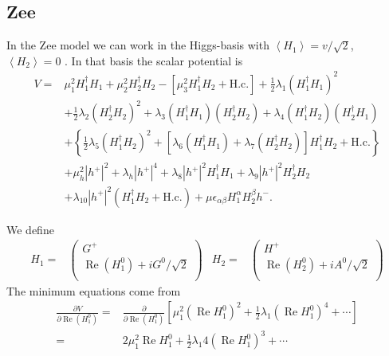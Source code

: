 \subsection{Zee}

In the Zee model we can work in the Higgs-basis with $\left\langle H_1 \right\rangle=v/\sqrt{2}$,  $\left\langle H_2 \right\rangle=0$ \cite{AristizabalSierra:2006ri}. In that basis the scalar potential is
\begin{align}
  \label{eq:scalarpotentialinhiggsbas}
  V  = & \mu^{2}_{1}H_{1}^{\dagger}H_{1}
  + \mu^{2}_{2}H_{2}^{\dagger}H_{2}
  - [\mu^{2}_{3}H_{1}^{\dagger}H_{2} + \mbox{H.c.}]
  + \frac{1}{2}\lambda_{1}(H_{1}^{\dagger}H_{1})^{2}
  \nonumber\\
  & + \frac{1}{2}\lambda_{2}(H_{2}^{\dagger}H_{2})^{2}
  + \lambda_{3}(H_{1}^{\dagger}
  H_{1})(H_{2}^{\dagger}H_{2})
  + \lambda_{4}(H_{1}^{\dagger}
  H_{2})(H_{2}^{\dagger}H_{1})
  \nonumber\\
  & + \left\{
    \frac{1}{2}\lambda_{5}(H_{1}^{\dagger}H_{2})^{2}
    + [\lambda_{6}(H_{1}^{\dagger}H_{1})
    + \lambda_{7}(H_{2}^{\dagger}H_{2})]
    H_{1}^{\dagger}H_{2}
    +\mbox{H.c.}
  \right\}
  \nonumber\\
  & + \mu_{h}^{2}|h^{+}|^{2} + \lambda_{h}|h^{+}|^{4}
  + \lambda_{8}|h^{+}|^{2}H_{1}^{\dagger}H_{1} 
  + \lambda_{9}|h^{+}|^{2}H_{2}^{\dagger}H_{2}
  \nonumber\\
  & + \lambda_{10}|h^{+}|^{2}(H_{1}^\dagger H_{2}
  + \mbox{H.c.})
  + \mu\epsilon_{\alpha\beta}H_{1}^{\alpha}
  H_{2}^{\beta}h^{-}.
\end{align}

We define
\begin{align}
  H_1=&
  \begin{pmatrix}
    G^{+}\\
    \operatorname{Re}\left( H_1^{0} \right)+i G^{0}/\sqrt{2}\\
  \end{pmatrix}&
  H_2=&
  \begin{pmatrix}
    H^{+}\\
    \operatorname{Re}\left( H_2^{0} \right)+i A^{0}/\sqrt{2}\\
  \end{pmatrix}
\end{align}
The minimum equations come from
\begin{align}
  \frac{\partial V}{\partial \operatorname{Re}\left( H_1^{0} \right)}=&
\frac{\partial }{\partial \operatorname{Re}\left( H_1^{0} \right)} \left[ 
\mu^{2}_{1}\left(\operatorname{Re}H_{1}^{0}  \right)^2
+\frac{1}{2}\lambda_1 \left(\operatorname{Re}H_{1}^{0}  \right)^4+\cdots  \right]\nonumber\\
=&2\mu^{2}_{1}\operatorname{Re}H_{1}^{0}  
+\frac{1}{2}\lambda_1 4 \left(\operatorname{Re}H_{1}^{0}  \right)^3+\cdots
\end{align}

